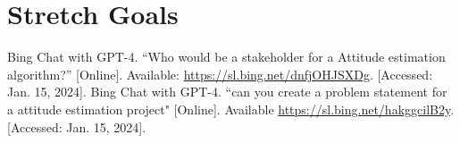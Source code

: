 \documentclass{article}
\begin{document}
\section{Stretch Goals}

\begin{thebibliography}{2}

     Bing Chat with GPT-4. “Who would be a stakeholder for a Attitude estimation algorithm?” [Online]. Available: \url{https://sl.bing.net/dnfjOHJSXDg}. [Accessed: Jan. 15, 2024].
     Bing Chat with GPT-4. “can you create a problem statement for a attitude estimation project" [Online]. Available \url{https://sl.bing.net/hakggcilB2y}. [Accessed: Jan. 15, 2024].
    
\end{thebibliography}
\end{document}
